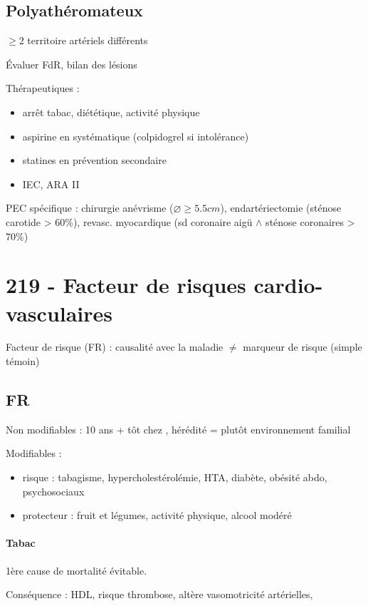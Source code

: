 \subsection{Polyathéromateux}

$\ge 2$ territoire artériels différents

Évaluer FdR, bilan des lésions

Thérapeutiques :
\begin{itemize}
  \item arrêt tabac, diététique, activité physique
  \item aspirine en systématique (colpidogrel si intolérance)
  \item statines en prévention secondaire
  \item \gls{IEC}, \gls{ARA II}
\end{itemize}

PEC spécifique : chirurgie anévrisme ($\diameter \ge 5.5cm$), endartériectomie
(sténose carotide > 60\%), revasc. myocardique (sd coronaire aigü $\wedge$
sténose coronaires > 70\%)

\section{219 - Facteur de risques cardio-vasculaires}%
\label{sec:219_facteur_de_risques_cardio_vasculaires}

Facteur de risque (FR) : causalité avec la maladie $\neq$ marqueur de risque
(simple témoin)

\subsection{FR}
Non modifiables : 10 ans + tôt chez \male, hérédité = plutôt environnement
familial

Modifiables : 
\begin{itemize}
  \item risque : {tabagisme, hypercholestérolémie, HTA, diabète, obésité abdo,
    psychosociaux}
  \item protecteur : {fruit et légumes, activité physique, alcool modéré}
\end{itemize}

\paragraph{Tabac}
1ère cause de mortalité évitable.

Conséquence : \dec HDL, \inc risque thrombose, altère vasomotricité artérielles,
\inc [CO]

